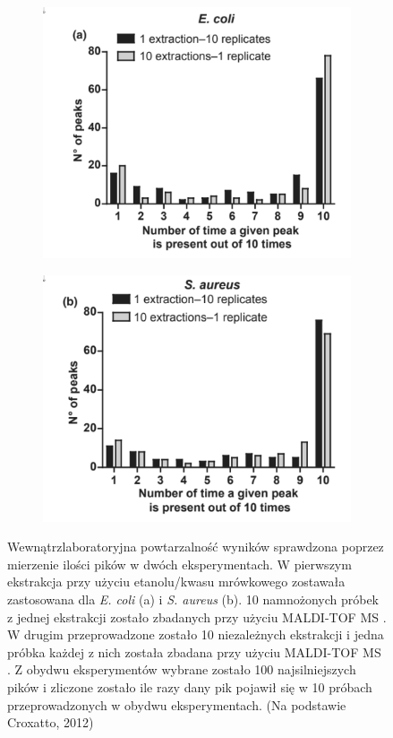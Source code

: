 \documentclass[two column, twoside, a4paper]{article}
\newcommand{\maldi}{MALDI-TOF MS }
\begin{document}
\begin{figure}[t]
\begin{tcolorbox}
	\begin{subfigure}{0.491\textwidth}
		\includegraphics[width=\textwidth]{./figures/reprod1.png}
	\end{subfigure}
	\begin{subfigure}{0.5\textwidth}
		\includegraphics[width=\textwidth]{./figures/reprod2.png}
	\end{subfigure}
	\caption{Wewnątrzlaboratoryjna powtarzalność wyników sprawdzona poprzez mierzenie ilości pików w dwóch eksperymentach. W pierwszym ekstrakcja przy użyciu etanolu/kwasu mrówkowego zostawała zastosowana dla \textit{E. coli} (a) i \textit{S. aureus} (b). 10 namnożonych próbek z jednej ekstrakcji zostało zbadanych przy użyciu \maldi. W drugim przeprowadzone zostało 10 niezależnych ekstrakcji i jedna próbka każdej z nich została zbadana przy użyciu \maldi. Z obydwu eksperymentów wybrane zostało 100 najsilniejszych pików i zliczone zostało ile razy dany pik pojawił się w 10 próbach przeprowadzonych w obydwu eksperymentach. (Na podstawie Croxatto, 2012)}\label{fig:reprod}
\end{tcolorbox}
\end{figure}
\end{document}
